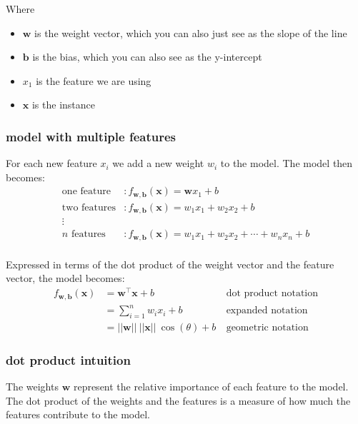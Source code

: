 \documentclass[12pt]{article}
\theoremstyle{definition}
\begin{document}
Where 
\begin{itemize}[leftmargin=*, noitemsep]
    \item $\mathbf{w}$ is the weight vector, which you can also just see as the slope of the line
    \item $\mathbf{b}$ is the bias, which you can also see as the y-intercept
    \item $x_1$ is the feature we are using 
    \item $\mathbf{x}$ is the instance
\end{itemize}

\subsubsection*{model with multiple features}

For each new feature $x_i$ we add a new weight $w_i$ to the model. The model then becomes:
\begin{align*}
    \text{one feature} & : f_{\mathbf{w}, \mathbf{b}} (\mathbf{x}) = \mathbf{w}x_1 + b \\
    \text{two features} & : f_{\mathbf{w}, \mathbf{b}} (\mathbf{x}) = w_1x_1 + w_2x_2 + b \\
    \vdots & \\
    \text{$n$ features} & : f_{\mathbf{w}, \mathbf{b}} (\mathbf{x}) = w_1x_1 + w_2x_2 + \cdots + w_n x_n + b \\
\end{align*}

Expressed in terms of the dot product of the weight vector and the feature vector, the model becomes:
\begin{align*}
    f_{\mathbf{w}, \mathbf{b}} (\mathbf{x}) &= \mathbf{w}^\intercal \mathbf{x} + b & \ \text{dot product notation} \\
    & = \sum_{i=1}^{n} w_i x_i + b & \ \text{expanded notation} \\ 
    & = ||\mathbf{w}||\ ||\mathbf{x}|| \ \cos(\theta) + b & \ \text{geometric notation}
\end{align*}

\subsubsection*{dot product intuition} 

The weights $\mathbf{w}$ represent the relative importance of each feature to the model. The dot product of the weights and the features is a measure of how much the features contribute to the model.
\end{document}
